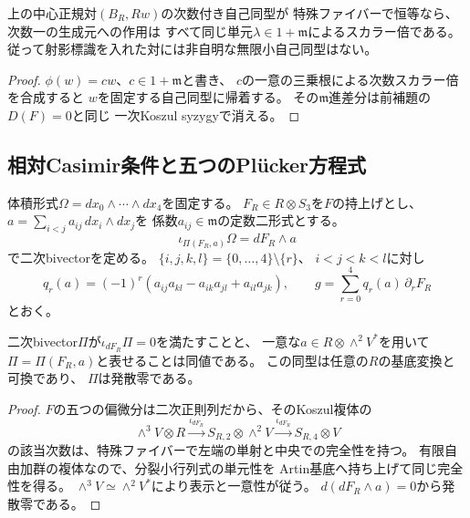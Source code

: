 \begin{corollary}[標識付き対の自己同型]
\label{cor:artin-scalar}
上の中心正規対$(B_R,Rw)$の次数付き自己同型が
特殊ファイバーで恒等なら、次数一の生成元への作用は
すべて同じ単元$\lambda\in1+\mathfrak m$によるスカラー倍である。
従って射影標識を入れた対には非自明な無限小自己同型はない。
\end{corollary}
\begin{proof}
$\phi(w)=cw$、$c\in1+\mathfrak m$と書き、
$c$の一意の三乗根による次数スカラー倍を合成すると
$w$を固定する自己同型に帰着する。
その$\mathfrak m$進差分は前補題の$D(F)=0$と同じ
一次Koszul syzygyで消える。
\end{proof}

\subsection{相対Casimir条件と五つのPl\"ucker方程式}
体積形式$\Omega=dx_0\wedge\cdots\wedge dx_4$を固定する。
$F_R\in R\otimes S_3$を$F$の持上げとし、
$a=\sum_{i<j}a_{ij}\,dx_i\wedge dx_j$を
係数$a_{ij}\in\mathfrak m$の定数二形式とする。
\[
 \iota_{\Pi(F_R,a)}\Omega=dF_R\wedge a
\]
で二次bivectorを定める。
$\{i,j,k,l\}=\{0,\ldots,4\}\setminus\{r\}$、
$i<j<k<l$に対し
\[
 q_r(a)=(-1)^r
 (a_{ij}a_{kl}-a_{ik}a_{jl}+a_{il}a_{jk}),\qquad
 g=\sum_{r=0}^4q_r(a)\,\partial_rF_R
\]
とおく。

\begin{lemma}[全Artin上でのCasimir核]
\label{lem:artin-casimir}
二次bivector$\Pi$が$\iota_{dF_R}\Pi=0$を満たすことと、
一意な$a\in R\otimes\wedge^2V^*$を用いて
$\Pi=\Pi(F_R,a)$と表せることは同値である。
この同型は任意の$R$の基底変換と可換であり、
$\Pi$は発散零である。
\end{lemma}
\begin{proof}
$F$の五つの偏微分は二次正則列だから、そのKoszul複体の
\[
 \wedge^3V\otimes R
 \xrightarrow{\iota_{dF_R}}
 S_{R,2}\otimes\wedge^2V
 \xrightarrow{\iota_{dF_R}}
 S_{R,4}\otimes V
\]
の該当次数は、特殊ファイバーで左端の単射と中央での完全性を持つ。
有限自由加群の複体なので、分裂小行列式の単元性を
Artin基底へ持ち上げて同じ完全性を得る。
$\wedge^3V\simeq\wedge^2V^*$により表示と一意性が従う。
$d(dF_R\wedge a)=0$から発散零である。
\end{proof}


